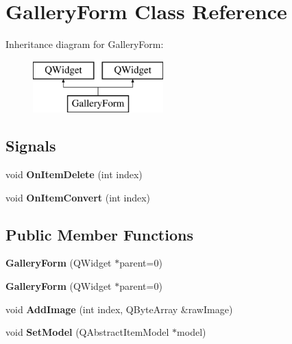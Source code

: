 \hypertarget{class_gallery_form}{}\section{Gallery\+Form Class Reference}
\label{class_gallery_form}
Inheritance diagram for Gallery\+Form\+:\begin{figure}[H]
\begin{center}
\leavevmode
\includegraphics[height=2.000000cm]{class_gallery_form}
\end{center}
\end{figure}
\subsection*{Signals}
\begin{DoxyCompactItemize}
\item 
\mbox{\label{class_gallery_form_addfd9450a0d74d1539e2668623199198}} 
void {\bfseries On\+Item\+Delete} (int index)
\item 
\mbox{\label{class_gallery_form_a988796418cca1e4ad61d7d3e7c4da3fb}} 
void {\bfseries On\+Item\+Convert} (int index)
\end{DoxyCompactItemize}
\subsection*{Public Member Functions}
\begin{DoxyCompactItemize}
\item 
\mbox{\label{class_gallery_form_ac733697191bca916d42a2a2cf8370f29}} 
{\bfseries Gallery\+Form} (Q\+Widget $\ast$parent=0)
\item 
\mbox{\label{class_gallery_form_ac733697191bca916d42a2a2cf8370f29}} 
{\bfseries Gallery\+Form} (Q\+Widget $\ast$parent=0)
\item 
\mbox{\label{class_gallery_form_adadbe8dca87679d1c3a8e9a85abc8ef7}} 
void {\bfseries Add\+Image} (int index, Q\+Byte\+Array \&raw\+Image)
\item 
\mbox{\label{class_gallery_form_a2aa9632ee68fed9318a34cffc6ab3402}} 
void {\bfseries Set\+Model} (Q\+Abstract\+Item\+Model $\ast$model)
\end{DoxyCompactItemize}


